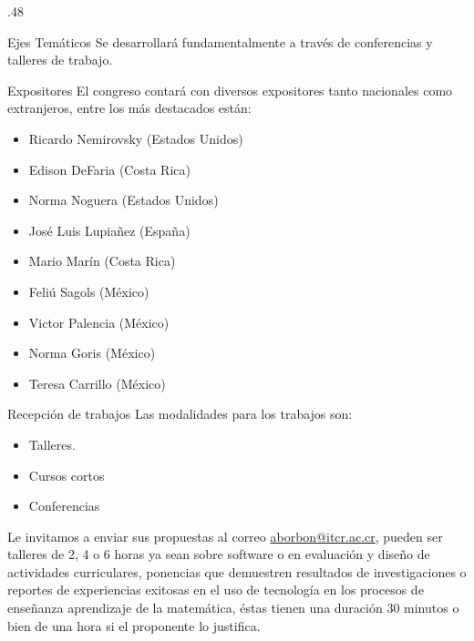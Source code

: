 \documentclass[x11names,table,usenames,dvipsnames]{beamer}
\begin{document}
\begin{frame}[plain]{}
\begin{columns}[t]
\begin{column}{.48\linewidth}
\begin{block}{Ejes Temáticos}
Se desarrollará fundamentalmente a través de conferencias y talleres de trabajo.
        \end{block}

        \begin{block}{Expositores}
El congreso contará con diversos expositores tanto nacionales como extranjeros, entre los más destacados están:

\begin{itemize}
\item Ricardo Nemirovsky (Estados Unidos)

\item Edison DeFaria (Costa Rica)

\item Norma Noguera (Estados Unidos)

\item José Luis Lupiañez (España)

\item Mario Marín (Costa Rica)

\item Feliú Sagols (México)

\item Victor Palencia (México)

\item Norma Goris (México)

\item Teresa Carrillo (México)
\end{itemize}
        \end{block}

        \begin{block}{Recepción de trabajos}
Las modalidades para los trabajos son:

\begin{itemize}
\item Talleres.

\item Cursos cortos

\item Conferencias
\end{itemize}

Le invitamos a enviar sus propuestas al correo \url{aborbon@itcr.ac.cr}, pueden ser talleres de 2, 4 o 6 horas ya sean sobre software o en evaluación  y diseño de actividades curriculares, ponencias que demuestren resultados de investigaciones o reportes de experiencias exitosas en el uso de tecnología en los procesos de enseñanza aprendizaje de la  matemática, éstas  tienen una duración  30 minutos o bien de una hora si el proponente lo justifica.


\end{block}
\end{column}
\end{columns}
\end{frame}
\end{document}
